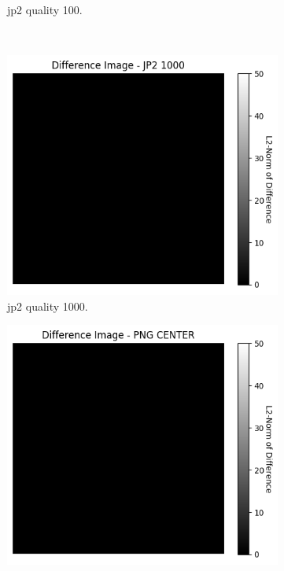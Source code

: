 \begin{figure}[htb]
\begin{subfigure}[b]{0.49\textwidth}
            \caption{\gls{jp2} quality 100.}
            \label{fig:img_quality_center_heatmap_100}
        \end{subfigure}
        \\
        \begin{subfigure}[b]{0.49\textwidth}
            \centering
            \includegraphics[width=\textwidth]{doc/thesis/0_figures/compare_quality/set1/jp2_1000_center_diff_heatmap.png}
            \caption{\gls{jp2} quality 1000.}
            \label{fig:img_quality_center_heatmap_1000}
        \end{subfigure}
        \begin{subfigure}[b]{0.49\textwidth}
            \centering
            \includegraphics[width=\textwidth]{doc/thesis/0_figures/compare_quality/set1/png_center_diff_heatmap.png}

\end{subfigure}
\end{figure}
